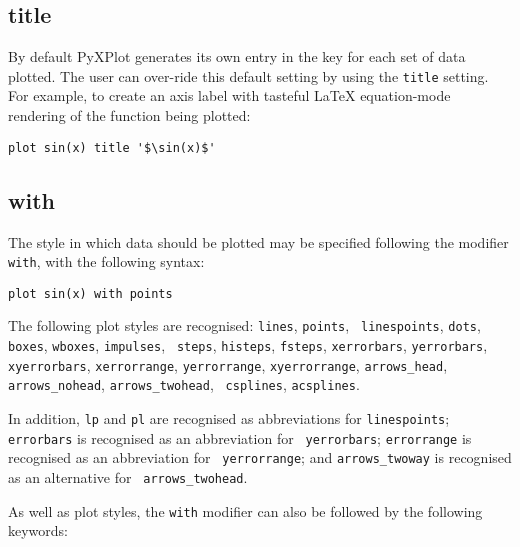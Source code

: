\subsection{title}

By default PyXPlot generates its own entry in the key for each set of data
plotted.  The user can over-ride this default setting by using the {\tt title}
setting.  For example, to create an axis label with tasteful \LaTeX{}
equation-mode rendering of the function being plotted:

\begin{verbatim}
plot sin(x) title '$\sin(x)$'
\end{verbatim}


\subsection{with}

The style in which data should be plotted may be specified following the
modifier {\tt with}, with the following syntax:

\begin{verbatim}
plot sin(x) with points
\end{verbatim}

\label{sec:list_of_plotstyles}
The following plot styles are recognised: {\tt lines}, {\tt points}, {\tt
linespoints}, {\tt dots}, {\tt boxes}, {\tt wboxes}, {\tt impulses}, {\tt
steps}, {\tt histeps}, {\tt fsteps}, {\tt xerrorbars}, {\tt yerrorbars}, {\tt
xyerrorbars}, {\tt xerrorrange}, {\tt yerrorrange}, {\tt xyerrorrange},
\newline\noindent %
{\tt arrows\_head}, {\tt arrows\_nohead}, {\tt arrows\_twohead}, {\tt
csplines}, {\tt acsplines}.

In addition, {\tt lp} and {\tt pl} are recognised as abbreviations
for {\tt linespoints}; {\tt errorbars} is recognised as an abbreviation for {\tt
yerrorbars}; {\tt errorrange} is recognised as an abbreviation for {\tt
yerrorrange}; and {\tt arrows\_twoway} is recognised as an alternative for {\tt
arrows\_twohead}.

As well as plot styles, the {\tt with} modifier can also be followed by the
following keywords:

